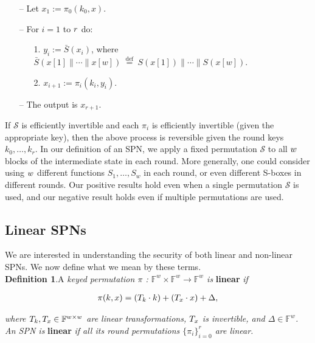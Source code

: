 \begin{itemize}
  \item[--]
  Let $x_{1} := \pi_{0}(k_{0},x)$.
  \item[--]
  For $i = 1$ to $\mathnormal{r}$ do:
  \begin{itemize}
    \item[1.]
    $y_{i} := \bar{S}(x_{i})$, where $\bar{S}(x[1]\|\cdots\| x[w]) \stackrel{\text { def }}{=} S(x[1])\|\cdots\| S(x[w])$.
    \item[2.]
    $x_{i + 1} := \pi_{i}(k_{i},y_{i})$.
  \end{itemize}
  \item[--]
  The output is $x_{r+1}$.
\end{itemize}

If $\mathcal{S}$ is efficiently invertible and each $\pi_{i}$ is efficiently invertible (given the appropriate key), then the above process is reversible given the round keys $k_{0}, \dots ,k_{r}$. In our definition of an SPN, we apply a fixed permutation $\mathcal{S}$ to all $\mathnormal{w}$ blocks of the intermediate state in each round. More generally, one could consider using $\mathnormal{w}$ different functions $S_{1}, \dots ,S_{w}$ in each round, or even different S-boxes in different rounds. Our positive results hold even when a single permutation $\mathcal{S}$ is used, and our negative result holds even if multiple permutations are used.



\subsection{Linear SPNs}
We are interested in understanding the security of both linear and non-linear SPNs. We now define what we mean by these terms.\\

\noindent \textbf{Definition 1}.A \emph{keyed permutation $\pi$ : $\mathbb{F}^{w} \times \mathbb{F}^{w} \rightarrow \mathbb{F}^{w}$ is} \textbf{linear} \emph{if}

$$
\begin{aligned}
\pi(k,x) = (\mathnormal{T}_{k} \cdot k) + (\mathnormal{T}_{x} \cdot x) + \Delta,
\end{aligned}
$$

\emph{where $\mathnormal{T}_{k}, \mathnormal{T}_{x} \in \mathbb{F}^{w \times w}$ are linear transformations, $\mathnormal{T}_{x}$ is invertible, and $\Delta \in \mathbb{F}^{w}$. An SPN is} \textbf{linear} \emph{ if all its round permutations $\{\pi_{i}\}_{i=0}^{r}$ are linear.}

